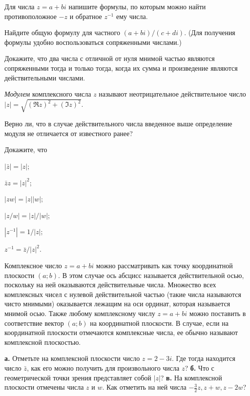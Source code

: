 \documentclass[a4paper, 12pt, num=21]{listok}
\begin{document}
\begin{problem}
	Для числа $z = a + bi$ напишите формулы, по которым можно найти противоположное $-z$ и обратное $z^{-1}$ ему числа.
\end{problem}
\begin{problem}
	Найдите общую формулу для частного $(a + bi)/(c + di)$. (Для получения формулы удобно воспользоваться сопряженными числами.)
\end{problem}
\begin{problem}
	Докажите, что два числа с отличной от нуля мнимой частью являются сопряженными
	тогда и только тогда, когда их сумма и произведение являются действительными числами.
\end{problem}
\begin{definition}
	\textit{Модулем} комплексного числа $z$ называют неотрицательное действительное число $|z| = \sqrt{{(\Re z)}^2 + {(\Im z)}^2}$.
\end{definition}
\begin{problem}
	Верно ли, что в случае действительного числа введенное выше определение модуля не отличается от известного ранее?
\end{problem}
\begin{problem}
	Докажите, что
	\begin{multienum}{3}
		\item $|\bar z| = |z|$;
		\item $\bar zz = |z|^2$;
		\item $|zw| = |z||w|$;
		\item $|z/w| = |z|/|w|$;
		\item $|z^{-1}| = 1/|z|$;
		\item $z^{-1} = \bar z/|z|^2$.
	\end{multienum}
\end{problem}
\begin{definition}
	Комплексное число $z = a + bi$ можно рассматривать как точку координатной плоскости $(a; b)$.
	В этом случае ось абсцисс называется действительной осью, поскольку на ней оказываются действительные числа.
	Множество всех комплексных чисел с нулевой действительной частью (такие числа называются чисто мнимыми) оказывается лежащим на оси ординат,
	которая называется мнимой осью.
	Также любому комплексному числу $z = a + bi$ можно поставить в соответствие вектор $(a; b)$ на координатной плоскости.
	В случае, если на координатной плоскости отмечаются комплексные числа, ее обычно называют комплексной плоскостью.
\end{definition}
\begin{problem}
	\textbf{а.} Отметьте на комплексной плоскости число $z = 2 - 3i$. Где тогда находится число $\bar z$,
	как его можно получить для произвольного числа $z$?
	\textbf{б.} Что с геометрической точки зрения представляет собой $|z|$?
	\textbf{в.} На комплексной плоскости отмечены числа $z$ и $w$.
	Как отметить на ней числа $-\frac 32 z, z + w, z - 2w$?
\end{problem}
\end{document}
